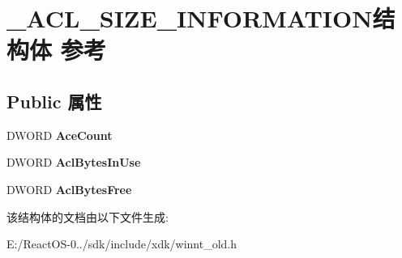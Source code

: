 \hypertarget{struct___a_c_l___s_i_z_e___i_n_f_o_r_m_a_t_i_o_n}{}\section{\+\_\+\+A\+C\+L\+\_\+\+S\+I\+Z\+E\+\_\+\+I\+N\+F\+O\+R\+M\+A\+T\+I\+O\+N结构体 参考}
\label{struct___a_c_l___s_i_z_e___i_n_f_o_r_m_a_t_i_o_n}
\subsection*{Public 属性}
\begin{DoxyCompactItemize}
\item 
\mbox{\label{struct___a_c_l___s_i_z_e___i_n_f_o_r_m_a_t_i_o_n_ae86f7ddceff4501c01b2bfdb38c898ef}} 
D\+W\+O\+RD {\bfseries Ace\+Count}
\item 
\mbox{\label{struct___a_c_l___s_i_z_e___i_n_f_o_r_m_a_t_i_o_n_a8a9156eff272d3fe233166f080716e05}} 
D\+W\+O\+RD {\bfseries Acl\+Bytes\+In\+Use}
\item 
\mbox{\label{struct___a_c_l___s_i_z_e___i_n_f_o_r_m_a_t_i_o_n_a8430e57f7b97436315ddccdd0e11597b}} 
D\+W\+O\+RD {\bfseries Acl\+Bytes\+Free}
\end{DoxyCompactItemize}


该结构体的文档由以下文件生成\+:\begin{DoxyCompactItemize}
\item 
E\+:/\+React\+O\+S-\/0../sdk/include/xdk/winnt\+\_\+old.\+h\end{DoxyCompactItemize}
